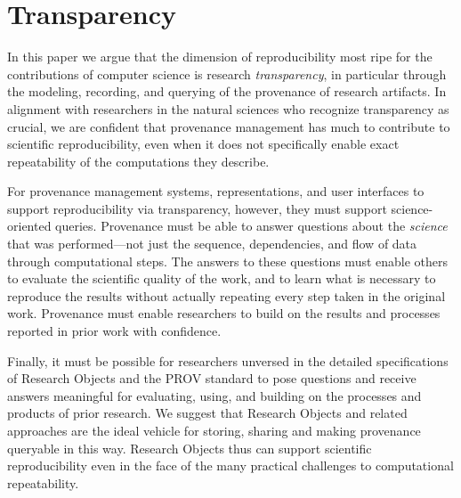 \section{Transparency}\label{sec-transparency}

In this paper we argue that the dimension of reproducibility most ripe for the contributions of computer science
	is research \emph{transparency}, in particular through the modeling, recording, and querying of the provenance of research artifacts.
In alignment with researchers in the natural sciences who recognize transparency as crucial,
	we are confident that provenance management has much to contribute to scientific reproducibility,
	 even when it does not specifically enable exact repeatability of the computations they describe.

For provenance management systems, representations, and user interfaces to support reproducibility via transparency,
	however, they must support science-oriented queries.
Provenance must be able to answer questions about the \emph{science} that was performed---not just the
	sequence, dependencies, and flow of data through computational steps.
The answers to these questions must enable others to evaluate the scientific quality of the work, and to learn what is necessary to
	reproduce the results without actually repeating every step taken in the original work.
Provenance must enable researchers to build on the results and processes reported in prior work with confidence.

Finally, it must be possible for researchers unversed in the detailed specifications of Research Objects and the PROV standard
	to pose questions and receive answers meaningful for evaluating, using, and building on the
	processes and products of prior research.
We suggest that Research Objects and related approaches are the ideal vehicle for storing, sharing and making
	provenance queryable in this way.
Research Objects thus can support scientific reproducibility even in the face of the many practical challenges to
	computational repeatability.


